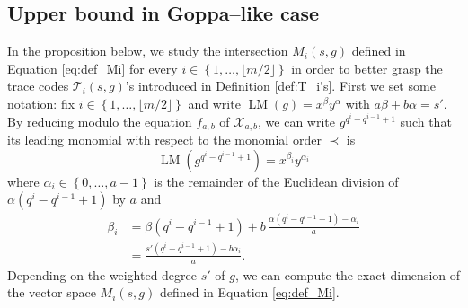 \documentclass[lettersize,journal]{IEEEtran}
\theoremstyle{plain}
\theoremstyle{definition}
\theoremstyle{remark}
\newcommand{\calT}{\mathcal{T}}
\newcommand{\calX}{\mathcal{X}}
\newcommand{\set}[1]{\left\{#1\right\}}
\newcommand{\LM}[1]{\operatorname{LM}\left(#1\right)}
\begin{document}
	\subsection{Upper bound in Goppa--like case} \label{subsection : Upper_bound_Goppa-like}
	In the proposition below, we study the intersection $M_i(s,g)$ defined in Equation \eqref{eq:def_Mi} for every $i \in \set{1,\dots,\lfloor m/2 \rfloor}$ in order to better grasp the trace codes $\calT_i(s,g)$'s introduced in Definition \ref{def:T_i's}.
	First we set some notation: fix $i \in \set{1,\dots,\lfloor m/2 \rfloor}$ and write $\LM{g}=x^\beta y^\alpha$ with $a\beta + b\alpha=s'$. By reducing modulo the equation $f_{a,b}$ of $\calX_{a,b}$, we can write $g^{q^i-q^{i-1}+1}$ such that its leading monomial with respect to the monomial order $\prec$ is
	\begin{equation}\label{eq:gi}
		\LM{g^{q^i-q^{i-1}+1}}=x^{\beta_i} y^{\alpha_i}
	\end{equation}
	where $\alpha_i \in \set{0,\dots,a-1}$ is the remainder of the Euclidean division of $\alpha (q^i-q^{i-1}+1)$ by $a$ and 
	\begin{equation}\label{eq:value_beta_prime}
		\begin{aligned}
		\beta_i	&=\beta(q^i-q^{i-1}+1) + b \, \frac{\alpha(q^i-q^{i-1}+1)-\alpha_i}{a}\\
				&= \frac{s'(q^i-q^{i-1}+1)-b\alpha_i}{a}.
				\end{aligned}
	\end{equation}
	Depending on the weighted degree $s'$ of $g$, we can compute the exact dimension of the vector space $M_i(s,g)$ defined in Equation \eqref{eq:def_Mi}.
	
\end{document}

